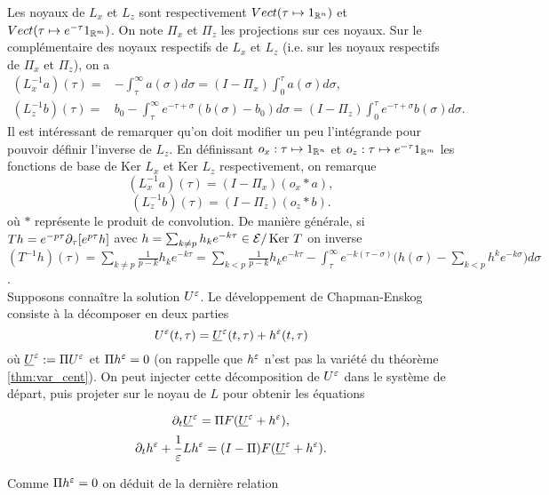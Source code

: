 Les noyaux de $L_x$ et $L_z$ sont respectivement $Vect(\tau\mapsto 1_{\mathbb{R}^n})$ et $Vect(\tau\mapsto e^{-\tau}1_{\mathbb{R}^m})$. 
On note $\Pi_x$ et $\Pi_z$ les projections sur ces noyaux. Sur le complémentaire des noyaux respectifs de $L_x$ et $L_z$ (i.e. sur les noyaux respectifs de $\Pi_x$ et $\Pi_z$), on a 
\begin{equation*}
\begin{array}{rl}
(L_x^{-1} a)(\tau) =& \displaystyle
-\int_{\tau}^{\infty} a(\sigma)d\sigma = (I - \Pi_x) \int_0^{\tau} a(\sigma)d\sigma , \\
(L_z^{-1} b)(\tau) =& \displaystyle
b_0 - \int_{\tau}^{\infty}e^{-\tau+\sigma} (b(\sigma) - b_0)d\sigma = (I - \Pi_z) \int_0^{\tau} e^{-\tau+\sigma}b(\sigma)d\sigma .
\end{array}
\end{equation*}
Il est intéressant de remarquer qu'on doit modifier un peu l'intégrande pour pouvoir définir l'inverse de $L_z$. 
En définissant $o_x : \tau \mapsto 1_{\mathbb{R}^n}$ et $o_z : \tau\mapsto e^{-\tau}1_{\mathbb{R}^m}$ les fonctions de base de $\text{Ker } L_x$ et $\text{Ker } L_z$ respectivement, on remarque 
$$ (L_x^{-1} a)(\tau) = (I - \Pi_x) (o_x * a), $$
$$ (L_z^{-1} b)(\tau) = (I - \Pi_z) (o_z * b). $$
où $*$ représente le produit de convolution. 
De manière générale, si $Th = e^{-p\tau}\partial_{\tau}[e^{p\tau}h]$ avec $h = \sum_{k\neq p} h_k e^{-k\tau} \in \mathcal{E} /\,\text{Ker }T $ on inverse $(T^{-1}h)(\tau) = \sum_{k \neq p} \frac{1}{p-k}h_k e^{-k\tau} = \sum_{k < p} \frac{1}{p-k}h_k e^{-k\tau} - \int_{\tau}^{\infty} e^{-k(\tau-\sigma)}\big( h(\sigma) - \sum_{k < p}h^k e^{-k\sigma} \big)d\sigma$.  \\

Supposons connaître la solution $U^{\varepsilon}$. %
Le développement de Chapman-Enskog consiste à la décomposer en deux parties 
$$ U^{\varepsilon}(t,\tau) = \underline{U}^{\varepsilon}(t,\tau) + h^{\varepsilon}(t,\tau) $$
où $\underline{U}^{\varepsilon} := \Pi U^{\varepsilon}$ et $\Pi h^{\varepsilon} = 0$ (on rappelle que $h^{\varepsilon}$ n'est pas la variété du théorème \ref{thm:var_cent}). 
On peut injecter cette décomposition de $U^{\varepsilon}$ dans le système de départ, puis projeter sur le noyau de $L$ pour obtenir les équations 

$$\partial_t \underline{U}^{\varepsilon} = \Pi F(\underline{U}^{\varepsilon}+h^{\varepsilon}), $$
$$\partial_t h^{\varepsilon} + \frac{1}{\varepsilon} Lh^{\varepsilon} = (I-\Pi)F(\underline{U}^{\varepsilon}+h^{\varepsilon}). $$

Comme $\Pi h^{\varepsilon} = 0$ on déduit de la dernière relation 

